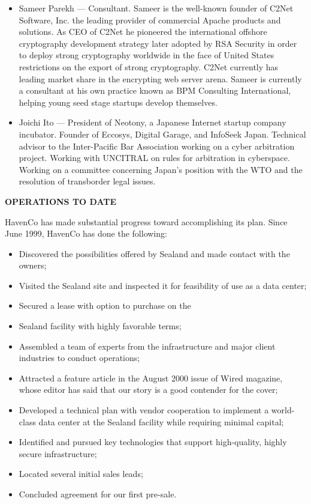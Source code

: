 \begin{itemize}
\item Sameer Parekh --- Consultant. Sameer is the well-known founder of C2Net Software, Inc. the leading provider of commercial Apache products and solutions. As CEO of C2Net he pioneered the international offshore cryptography development strategy later adopted by RSA Security in order to deploy strong cryptography worldwide in the face of United States restrictions on the export of strong cryptography. C2Net currently has leading market share in the encrypting web server arena. Sameer is currently a consultant at his own practice known as BPM Consulting International, helping young seed stage startups develop themselves.
\item Joichi Ito --- President of Neotony, a Japanese Internet startup company incubator. Founder of Eccosys, Digital Garage, and InfoSeek Japan. Technical advisor to the Inter-Pacific Bar Association working on a cyber arbitration project. Working with UNCITRAL on rules for arbitration in cyberspace. Working on a committee concerning Japan's position with the WTO and the resolution of transborder legal issues.
\end{itemize}

\textbf{OPERATIONS TO DATE}
 
HavenCo has made substantial progress toward accomplishing its plan.  Since June 1999, HavenCo has done the following:

\begin{itemize}
\item Discovered the possibilities offered by Sealand and made contact with the owners;
\item Visited the Sealand site and inspected it for feasibility of use as a data center;
\item Secured a lease with option to purchase on the \item Sealand facility with highly favorable terms;
\item Assembled a team of experts from the infrastructure and major client industries to conduct operations;
\item Attracted a feature article in the August 2000 issue of Wired magazine, whose editor has said that our story is a good contender for the cover;
\item Developed a technical plan with vendor cooperation to implement a world-class data center at the Sealand facility while requiring minimal capital;
\item Identified and pursued key technologies that support high-quality, highly secure infrastructure;
\item Located several initial sales leads;
\item Concluded agreement for our first pre-sale.
\end{itemize}

